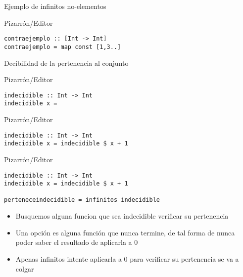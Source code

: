 \documentclass[pdf]{beamer}
\begin{document}
\begin{frame}[fragile]{Ejemplo de infinitos no-elementos}



\begin{block}{Pizarrón/Editor}
\begin{verbatim}
contraejemplo :: [Int -> Int]
contraejemplo = map const [1,3..]
\end{verbatim}
\end{block}


\end{frame}

\begin{frame}[fragile]{Decibilidad de la pertenencia al conjunto}

\begin{overprint}
    
\begin{block}{Pizarrón/Editor}
\begin{verbatim}
indecidible :: Int -> Int
indecidible x = 
\end{verbatim}
\end{block}

\begin{block}{Pizarrón/Editor}
\begin{verbatim}
indecidible :: Int -> Int
indecidible x = indecidible $ x + 1
\end{verbatim}
\end{block}

\begin{block}{Pizarrón/Editor}
\begin{verbatim}
indecidible :: Int -> Int
indecidible x = indecidible $ x + 1

perteneceindecidible = infinitos indecidible
\end{verbatim}
\end{block}

\end{overprint}

\begin{itemize}
    \item<1-> Busquemos alguna funcion que sea indecidible verificar su pertenencia
    \item<2-> Una opción es alguna función que nunca termine, de tal forma de nunca poder saber el resultado de aplicarla a 0
    \item<3-> Apenas infinitos intente aplicarla a 0 para verificar su pertenencia se va a colgar
\end{itemize}


\end{frame}
\end{document}
